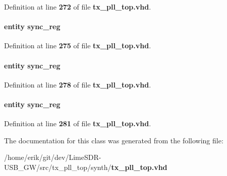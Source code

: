 Definition at line {\bf 272} of file {\bf tx\+\_\+pll\+\_\+top.\+vhd}.

\paragraph[{sync\+\_\+reg7}]{ {\bfseries \textcolor{keywordflow}{entity}\textcolor{vhdlchar}{ }\textcolor{vhdlchar}{sync\+\_\+reg}\textcolor{vhdlchar}{ }} \hspace{0.3cm}{\ttfamily [Instantiation]}}\label{classtx__pll__top_1_1arch_abc82c2116ca5d686a75265e0700ced0f}


Definition at line {\bf 275} of file {\bf tx\+\_\+pll\+\_\+top.\+vhd}.

\paragraph[{sync\+\_\+reg8}]{ {\bfseries \textcolor{keywordflow}{entity}\textcolor{vhdlchar}{ }\textcolor{vhdlchar}{sync\+\_\+reg}\textcolor{vhdlchar}{ }} \hspace{0.3cm}{\ttfamily [Instantiation]}}\label{classtx__pll__top_1_1arch_a0b58a7cce800b7229df5690cd0a3e1c2}


Definition at line {\bf 278} of file {\bf tx\+\_\+pll\+\_\+top.\+vhd}.

\paragraph[{sync\+\_\+reg9}]{ {\bfseries \textcolor{keywordflow}{entity}\textcolor{vhdlchar}{ }\textcolor{vhdlchar}{sync\+\_\+reg}\textcolor{vhdlchar}{ }} \hspace{0.3cm}{\ttfamily [Instantiation]}}\label{classtx__pll__top_1_1arch_ad427c2115b432af5129d6a9ccb7a4788}


Definition at line {\bf 281} of file {\bf tx\+\_\+pll\+\_\+top.\+vhd}.



The documentation for this class was generated from the following file\+:\begin{DoxyCompactItemize}
\item 
/home/erik/git/dev/\+Lime\+S\+D\+R-\/\+U\+S\+B\+\_\+\+G\+W/src/tx\+\_\+pll\+\_\+top/synth/{\bf tx\+\_\+pll\+\_\+top.\+vhd}\end{DoxyCompactItemize}
